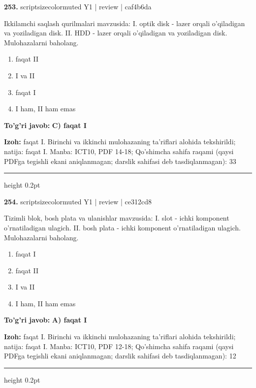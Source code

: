 \documentclass[10pt,a4paper]{article}
\begin{document}
{\bfseries\sffamily\color{ink} 253.} {scriptsizecolor{muted} Y1 | review | caf4b6da}
\par
Ikkilamchi saqlash qurilmalari mavzusida: I. optik disk - lazer orqali o'qiladigan va yoziladigan disk. II. HDD - lazer orqali o'qiladigan va yoziladigan disk. Mulohazalarni baholang.
\begin{enumerate}[label=\Alph*),leftmargin=9mm]
\item faqat II
\item I va II
\item faqat I
\item I ham, II ham emas
\end{enumerate}
\begin{tcolorbox}[enhanced,breakable,colback=teal!4,colframe=teal!60!black,boxrule=0.45pt,arc=1.2mm,left=2.7mm,right=2.7mm,top=1.8mm,bottom=1.8mm,before skip=2mm,after skip=2mm]
{\bfseries\sffamily\color{teal}To'g'ri javob:} \textbf{C) faqat I}
\par\smallskip
{\bfseries Izoh:} faqat I. Birinchi va ikkinchi mulohazaning ta'riflari alohida tekshirildi; natija: faqat I. Manba: ICT10, PDF 14-18; Qo'shimcha sahifa raqami (qaysi PDFga tegishli ekani aniqlanmagan; darslik sahifasi deb tasdiqlanmagan): 33
\end{tcolorbox}
\vspace{2mm}\hrule height 0.2pt\vspace{3mm}

{\bfseries\sffamily\color{ink} 254.} {scriptsizecolor{muted} Y1 | review | ce312cd8}
\par
Tizimli blok, bosh plata va ulanishlar mavzusida: I. slot - ichki komponent o'rnatiladigan ulagich. II. bosh plata - ichki komponent o'rnatiladigan ulagich. Mulohazalarni baholang.
\begin{enumerate}[label=\Alph*),leftmargin=9mm]
\item faqat I
\item faqat II
\item I va II
\item I ham, II ham emas
\end{enumerate}
\begin{tcolorbox}[enhanced,breakable,colback=teal!4,colframe=teal!60!black,boxrule=0.45pt,arc=1.2mm,left=2.7mm,right=2.7mm,top=1.8mm,bottom=1.8mm,before skip=2mm,after skip=2mm]
{\bfseries\sffamily\color{teal}To'g'ri javob:} \textbf{A) faqat I}
\par\smallskip
{\bfseries Izoh:} faqat I. Birinchi va ikkinchi mulohazaning ta'riflari alohida tekshirildi; natija: faqat I. Manba: ICT10, PDF 12-18; Qo'shimcha sahifa raqami (qaysi PDFga tegishli ekani aniqlanmagan; darslik sahifasi deb tasdiqlanmagan): 12
\end{tcolorbox}
\vspace{2mm}\hrule height 0.2pt\vspace{3mm}
\end{document}
